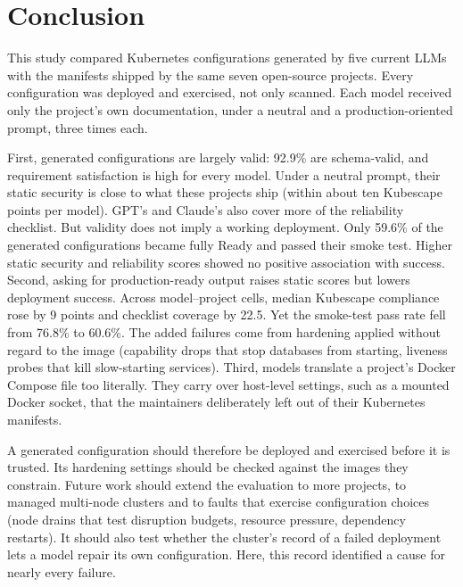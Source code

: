\section{Conclusion}\label{sec:conclusion}

This study compared Kubernetes configurations generated by five current LLMs with the manifests shipped by the same seven open-source projects. Every configuration was deployed and exercised, not only scanned. Each model received only the project's own documentation, under a neutral and a production-oriented prompt, three times each.

First, generated configurations are largely valid: 92.9\% are schema-valid, and requirement satisfaction is high for every model. Under a neutral prompt, their static security is close to what these projects ship (within about ten Kubescape points per model). GPT's and Claude's also cover more of the reliability checklist. But validity does not imply a working deployment. Only 59.6\% of the generated configurations became fully Ready and passed their smoke test. Higher static security and reliability scores showed no positive association with success. Second, asking for production-ready output raises static scores but lowers deployment success. Across model--project cells, median Kubescape compliance rose by 9 points and checklist coverage by 22.5. Yet the smoke-test pass rate fell from 76.8\% to 60.6\%. The added failures come from hardening applied without regard to the image (capability drops that stop databases from starting, liveness probes that kill slow-starting services). Third, models translate a project's Docker Compose file too literally. They carry over host-level settings, such as a mounted Docker socket, that the maintainers deliberately left out of their Kubernetes manifests.

A generated configuration should therefore be deployed and exercised before it is trusted. Its hardening settings should be checked against the images they constrain. Future work should extend the evaluation to more projects, to managed multi-node clusters and to faults that exercise configuration choices (node drains that test disruption budgets, resource pressure, dependency restarts). It should also test whether the cluster's record of a failed deployment lets a model repair its own configuration. Here, this record identified a cause for nearly every failure.
